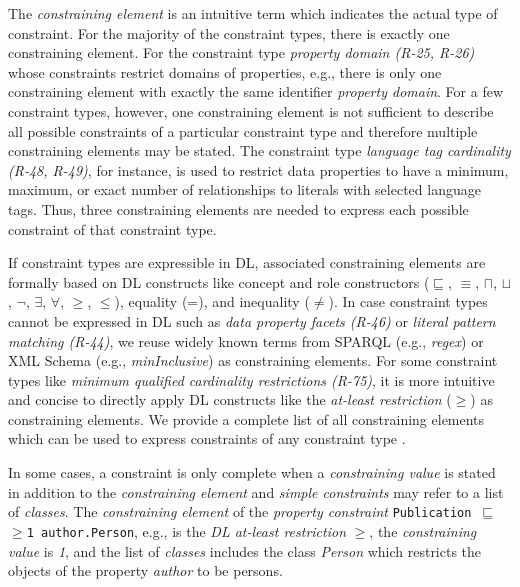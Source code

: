 \documentclass[a4paper,fontsize=11pt]{scrartcl}
\newcommand{\ms}[1]{\texttt{#1}}
\begin{document}
The \emph{constraining element} is an intuitive term which indicates the actual type of constraint. For the majority of the constraint types, there is exactly one constraining element. For the constraint type \emph{property domain (R-25, R-26)} whose constraints restrict domains of properties, e.g., there is only one constraining element with exactly the same identifier \emph{property domain}. For a few constraint types, however, one constraining element is not sufficient to describe all possible constraints of a particular constraint type and therefore multiple constraining elements may be stated. The constraint type \emph{language tag cardinality (R-48, R-49)}, for instance, is used to restrict data properties to have a minimum, maximum, or exact number of relationships to literals with selected language tags. Thus, three constraining elements are needed to express each possible constraint of that constraint type.

If constraint types are expressible in DL, associated constraining elements are formally based on DL constructs like concept and role constructors ($\sqsubseteq$, $\equiv$, $\sqcap$, $\sqcup$, $\neg$, $\exists$, $\forall$, $\geq$, $\leq$), equality (=), and inequality ($\ne$). In case constraint types cannot be expressed in DL such as \emph{data property facets (R-46)} or \emph{literal pattern matching (R-44)}, we reuse widely known terms from SPARQL (e.g., \emph{regex}) or XML Schema (e.g., \emph{minInclusive}) as constraining elements. For some constraint types like \emph{minimum qualified cardinality restrictions (R-75)}, it is more intuitive and concise to directly apply DL constructs like the \emph{at-least restriction} ($\geq$) as constraining elements. We provide a complete list of all constraining elements which can be used to express constraints of any constraint type \cite{BoschNolleAcarEckert2015}. 

In some cases, a constraint is only complete when a \emph{constraining value} is stated in addition to the \emph{constraining element}
and \emph{simple constraints} may refer to a list of \emph{classes}.
The \emph{constraining element} of the \emph{property constraint} {\small\ms{Publication $\sqsubseteq$ $\geq$1 author.Person},} e.g.,  is the \emph{DL at-least restriction} \emph{$\geq$}, the \emph{constraining value} is \emph{1}, and
the list of \emph{classes} includes the class \emph{Person} which restricts the objects of the property \emph{author} to be persons.
\end{document}
